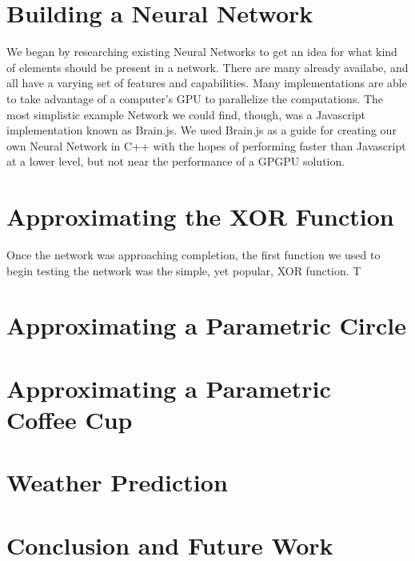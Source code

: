 \documentclass{article}
\begin{document}
\begin{multicols}{2}
\section{Building a Neural Network}

We began by researching existing Neural Networks to get an idea for what kind of elements should be present in a network. There are many already availabe, and all have a varying set of features and capabilities. Many implementations are able to take advantage of a computer's GPU to parallelize the computations. The most simplistic example Network we could find, though, was a Javascript implementation known as Brain.js. We used Brain.js as a guide for creating our own Neural Network in C++ with the hopes of performing faster than Javascript at a lower level, but not near the performance of a GPGPU solution.

\section{Approximating the XOR Function}

Once the network was approaching completion, the first function we used to begin testing the network was the simple, yet popular, XOR function. T

\section{Approximating a Parametric Circle}

\section{Approximating a Parametric Coffee Cup}

\section{Weather Prediction}

\section{Conclusion and Future Work}



\end{multicols}
\end{document}
